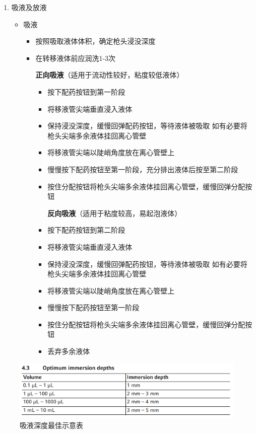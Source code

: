\documentclass[
]{book}
\providecommand{\tightlist}{%
  \setlength{\itemsep}{0pt}\setlength{\parskip}{0pt}}
\begin{document}
\begin{enumerate}
\def\labelenumi{\arabic{enumi}.}
\setcounter{enumi}{2}
\tightlist
\item
  吸液及放液

  \begin{itemize}
  \item
    吸液

    \begin{itemize}
    \item
      按照吸取液体体积，确定枪头浸没深度
    \item
      在转移液体前应润洗1-3次

      \textbf{正向吸液}（适用于流动性较好，粘度较低液体）

      \begin{itemize}
      \item
        按下配药按钮到第一阶段
      \item
        将移液管尖端垂直浸入液体
      \item
        保持浸没深度，缓慢回弹配药按钮，等待液体被吸取 如有必要将枪头尖端多余液体挂回离心管壁
      \item
        将移液管尖端以陡峭角度放在离心管壁上
      \item
        慢慢按下配药按钮至第一阶段，充分排出液体后按至第二阶段
      \item
        按住分配按钮将枪头尖端多余液体挂回离心管壁，缓慢回弹分配按钮

        \textbf{反向吸液}（适用于粘度较高，易起泡液体）
      \item
        按下配药按钮到第二阶段
      \item
        将移液管尖端垂直浸入液体
      \item
        保持浸没深度，缓慢回弹配药按钮，等待液体被吸取 如有必要将枪头尖端多余液体挂回离心管壁
      \item
        将移液管尖端以陡峭角度放在离心管壁上
      \item
        慢慢按下配药按钮至第一阶段
      \item
        按住分配按钮将枪头尖端多余液体挂回离心管壁，缓慢回弹分配按钮
      \item
        丢弃多余液体
      \end{itemize}
    \end{itemize}
  \end{itemize}
\end{enumerate}

\begin{figure}

{\centering \includegraphics[width=0.5\linewidth]{images/Pasted image 20220802014111} 

}

\caption{吸液深度最佳示意表}\label{fig:unnamed-chunk-4}
\end{figure}
\end{document}
